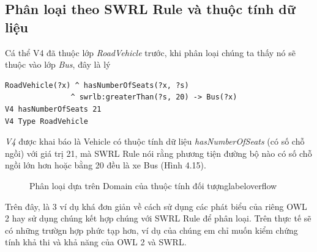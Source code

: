 \subsection{Phân loại theo SWRL Rule và thuộc tính dữ liệu} 
Cá thể V4 đã thuộc lớp \textit{RoadVehicle} trước, khi phân loại chúng ta thấy nó sẽ thuộc vào lớp \textit{Bus}, đây là lý \begin{verbatim}
RoadVehicle(?x) ^ hasNumberOfSeats(?x, ?s) 
               ^ swrlb:greaterThan(?s, 20) -> Bus(?x)
V4 hasNumberOfSeats 21
V4 Type RoadVehicle
\end{verbatim}
\textit{V4} được khai báo là Vehicle có thuộc tính dữ liệu \textit{hasNumberOfSeats} (có số chỗ ngồi) với giá trị 21, mà SWRL Rule nói rằng phương tiện đường bộ nào có số chỗ ngồi lớn hơn hoặc bằng 20 đều là xe Bus (Hình 4.15).
\begin{figure}[h!]
	\centering
	\caption{Phân loại dựa trên Domain của thuộc tính đối tượnglabel{overflow}}
\end{figure}
Trên đây, là 3 ví dụ khá đơn giản về cách sử dụng các phát biểu của riêng OWL 2 hay sử dụng chúng kết hợp chúng với SWRL Rule để phân loại. Trên thực tế sẽ có những trườgn hợp phức tạp hơn, ví dụ của chúng em chỉ muốn kiểm chứng tính khả thi và khả năng của OWL 2 và SWRL.
